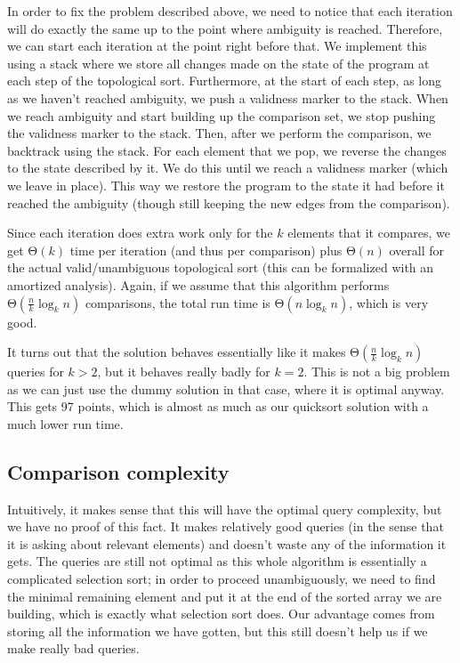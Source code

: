 \documentclass{article}
\begin{document}
In order to fix the problem described above, we need to notice that each iteration will do exactly the same up to the point where ambiguity is reached. Therefore, we can start each iteration at the point right before that. We implement this using a stack where we store all changes made on the state of the program at each step of the topological sort. Furthermore, at the start of each step, as long as we haven't reached ambiguity, we push a validness marker to the stack. When we reach ambiguity and start building up the comparison set, we stop pushing the validness marker to the stack. Then, after we perform the comparison, we backtrack using the stack. For each element that we pop, we reverse the changes to the state described by it. We do this until we reach a validness marker (which we leave in place). This way we restore the program to the state it had before it reached the ambiguity (though still keeping the new edges from the comparison).

Since each iteration does extra work only for the $k$ elements that it compares, we get $ \mathrm{\Theta}\left( k \right) $ time per iteration (and thus per comparison) plus $ \mathrm{\Theta}\left( n \right) $ overall for the actual valid/unambiguous topological sort (this can be formalized with an amortized analysis). Again, if we assume that this algorithm performs $ \mathrm{\Theta}\left( \frac{n}{k} \log_k{n} \right) $ comparisons, the total run time is $ \mathrm{\Theta}\left( n \log_k{n} \right) $, which is very good.

It turns out that the solution behaves essentially like it makes $ \mathrm{\Theta}\left( \frac{n}{k} \log_k{n} \right) $ queries for $ k > 2 $, but it behaves really badly for $ k = 2 $. This is not a big problem as we can just use the dummy solution in that case, where it is optimal anyway. This gets 97 points, which is almost as much as our quicksort solution with a much lower run time.

\subsection{Comparison complexity}

Intuitively, it makes sense that this will have the optimal query complexity, but we have no proof of this fact. It makes relatively good queries (in the sense that it is asking about relevant elements) and doesn't waste any of the information it gets. The queries are still not optimal as this whole algorithm is essentially a complicated selection sort; in order to proceed unambiguously, we need to find the minimal remaining element and put it at the end of the sorted array we are building, which is exactly what selection sort does. Our advantage comes from storing all the information we have gotten, but this still doesn't help us if we make really bad queries.
\end{document}
